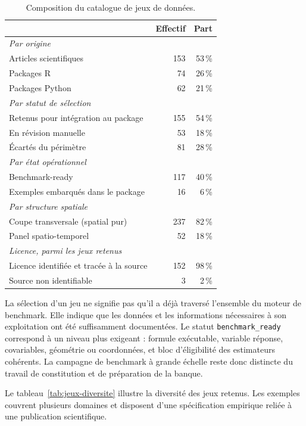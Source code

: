 \documentclass[11pt,a4paper]{article}
\begin{document}
\begin{table}[h]
\centering
\small
\begin{tabular}{lrr}
\toprule
& Effectif & Part \\
\midrule
\multicolumn{3}{l}{\textit{Par origine}} \\
Articles scientifiques & 153 & 53\,\% \\
Packages R & 74 & 26\,\% \\
Packages Python & 62 & 21\,\% \\
\midrule
\multicolumn{3}{l}{\textit{Par statut de sélection}} \\
Retenus pour intégration au package & 155 & 54\,\% \\
En révision manuelle & 53 & 18\,\% \\
Écartés du périmètre & 81 & 28\,\% \\
\midrule
\multicolumn{3}{l}{\textit{Par état opérationnel}} \\
Benchmark-ready & 117 & 40\,\% \\
Exemples embarqués dans le package & 16 & 6\,\% \\
\midrule
\multicolumn{3}{l}{\textit{Par structure spatiale}} \\
Coupe transversale (spatial pur) & 237 & 82\,\% \\
Panel spatio-temporel & 52 & 18\,\% \\
\midrule
\multicolumn{3}{l}{\textit{Licence, parmi les jeux retenus}} \\
Licence identifiée et tracée à la source & 152 & 98\,\% \\
Source non identifiable & 3 & 2\,\% \\
\bottomrule
\end{tabular}
\caption{Composition du catalogue de jeux de données.}
\label{tab:composition-catalogue}
\end{table}

La sélection d'un jeu ne signifie pas qu'il a déjà traversé l'ensemble du moteur de benchmark. Elle indique que les données et les informations nécessaires à son exploitation ont été suffisamment documentées. Le statut \texttt{benchmark\_ready} correspond à un niveau plus exigeant : formule exécutable, variable réponse, covariables, géométrie ou coordonnées, et bloc d'éligibilité des estimateurs cohérents. La campagne de benchmark à grande échelle reste donc distincte du travail de constitution et de préparation de la banque.

Le tableau~\ref{tab:jeux-diversite} illustre la diversité des jeux retenus. Les exemples couvrent plusieurs domaines et disposent d'une spécification empirique reliée à une publication scientifique.
\end{document}
